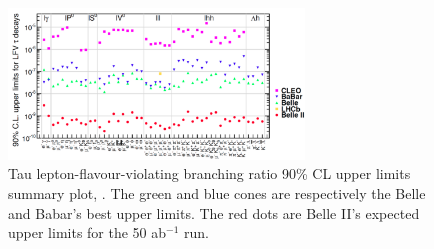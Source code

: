 \begin{figure}[!h]
\centering
\includegraphics[width =0.7\textwidth]{figures/png/Screenshot_20240319_134052.png}
\caption[Tau lepton-flavour-violating branching ratio upper limits.]{Tau lepton-flavour-violating branching ratio 90\% CL upper limits summary plot, \cite{universe4100101}. The green and blue cones 
are respectively the Belle and Babar's best upper limits. The red dots are Belle II's expected upper limits for the 50 ab$^{-1}$ run.}
\label{fig:tauchannel}
\end{figure}


